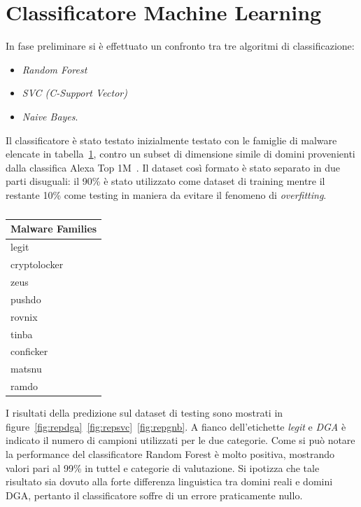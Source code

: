\section{Classificatore Machine Learning}
\label{res:crf}
In fase preliminare si è effettuato un confronto tra tre algoritmi di classificazione: 
\begin{itemize}
\item \textit{Random Forest}
\item \textit{SVC (C-Support Vector)}
\item \textit{Naive Bayes}. 
\end{itemize}
Il classificatore è stato testato inizialmente testato con le famiglie di malware elencate in tabella~\ref{tab:malware}, contro un subset di dimensione simile di domini provenienti dalla classifica Alexa Top 1M~\cite{amazon:alexa}. Il dataset così formato è stato separato in due parti disuguali: il 90\% è stato utilizzato come dataset di training mentre il restante 10\% come testing in maniera da evitare il fenomeno di \textit{overfitting}. 

\begin{table}[!bp]
    \centering
    \begin{tabular}[t]{l}
    \toprule
    Malware Families \\
    \midrule
	legit \\
	cryptolocker \\
	zeus \\
	pushdo \\
	rovnix \\
	tinba \\
	conficker \\
	matsnu \\
	ramdo \\
	\bottomrule
\end{tabular}
\caption{\label{tab:malware}}
\end{table}

I risultati della predizione sul dataset di testing sono mostrati in figure~\ref{fig:repdga}~\ref{fig:repsvc}~\ref{fig:repgnb}. A fianco dell'etichette \textit{legit} e \textit{DGA} è indicato il numero di campioni utilizzati per le due categorie. Come si può notare la performance del classificatore Random Forest è molto positiva, mostrando valori pari al 99\% in tuttel e categorie di valutazione.  Si ipotizza che tale risultato sia dovuto alla forte differenza linguistica tra domini reali e domini DGA, pertanto il classificatore soffre di un errore praticamente nullo. 

